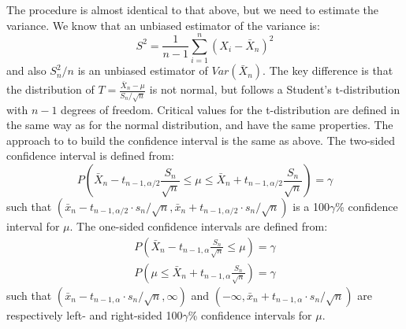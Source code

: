 The procedure is almost identical to that above, but we need to estimate the variance. We know that an unbiased estimator of the variance is:
\begin{equation*}
    S^2 = \frac{1}{n-1} \sum_{i=1}^n (X_i - \bar{X}_n)^2
\end{equation*}
and also $S_n^2/n$ is an unbiased estimator of $Var(\bar{X}_n)$. The key difference is that the distribution of $T = \frac{\bar{X}_n - \mu}{S_n / \sqrt{n}}$ is not normal, but follows a Student's t-distribution with $n-1$ degrees of freedom.
Critical values for the t-distribution are defined in the same way as for the normal distribution, and have the same properties.
The approach to to build the confidence interval is the same as above. The two-sided confidence interval is defined from:
\begin{equation*}
    P(\bar{X}_n - t_{n-1, \alpha/2} \frac{S_n}{\sqrt{n}} \leq \mu \leq \bar{X}_n + t_{n-1, \alpha/2} \frac{S_n}{\sqrt{n}}) = \gamma
\end{equation*}
such that $(\bar{x}_n - t_{n-1, \alpha/2} \cdot s_n/\sqrt{n}, \bar{x}_n + t_{n-1, \alpha/2} \cdot s_n/\sqrt{n})$ is a 100$\gamma$\% confidence interval for $\mu$. The one-sided confidence intervals are defined from:
\begin{gather*}
    P(\bar{X}_n - t_{n-1, \alpha} \frac{S_n}{\sqrt{n}} \leq \mu) = \gamma \\
    P(\mu \leq \bar{X}_n + t_{n-1, \alpha} \frac{S_n}{\sqrt{n}}) = \gamma
\end{gather*}
such that $(\bar{x}_n - t_{n-1, \alpha} \cdot s_n/\sqrt{n}, \infty)$ and $(-\infty, \bar{x}_n + t_{n-1, \alpha} \cdot s_n/\sqrt{n})$ are respectively left- and right-sided 100$\gamma$\% confidence intervals for $\mu$.

